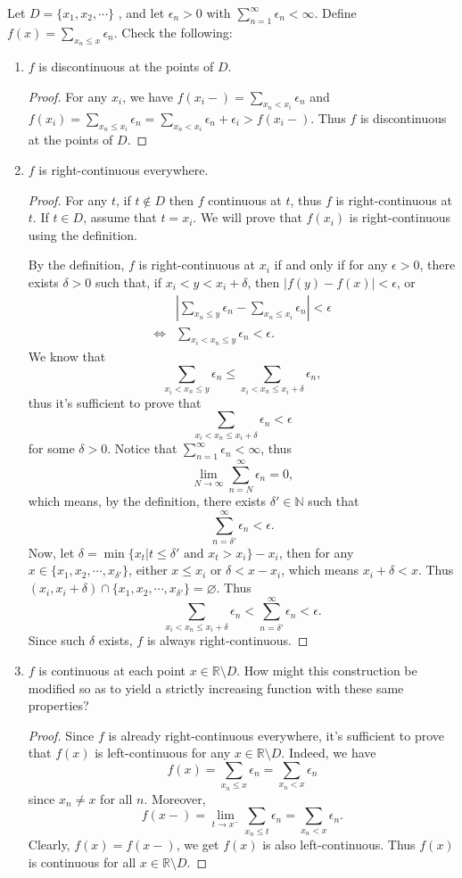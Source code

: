 \documentclass[12pt, a4paper]{article}
\theoremstyle{plain}
\newcommand{\N}{\mathbb{N}}
\newcommand{\R}{\mathbb{R}}
\begin{document}
\begin{exercise}{34}
	Let $D =\{x_1, x_2,\cdots\}$ , and let $\epsilon_n > 0$ with $\sum_{n=1}^\infty{\epsilon_n}<\infty$. Define $f(x) = \sum_{x_n\leq x}{\epsilon_n}$. Check the following: 
	\begin{enumerate}[label=(\roman*)]
	\item  $f$ is discontinuous at the points of $D$.
		\begin{proof}
		For any $x_i$, we have $f(x_i-)=\sum_{x_n<x_i}\epsilon_n$ and $f(x_i)=\sum_{x_n\leq x_i}\epsilon_n=\sum_{x_n<x_i}\epsilon_n+\epsilon_i>f(x_i-)$. Thus $f$ is discontinuous at the points of $D$.
		\end{proof}
	\item $f$ is right-continuous everywhere.
		\begin{proof}
		For any $t$, if $t\notin D$ then $f$ continuous at $t$, thus $f$ is right-continuous at $t$. If $t\in D$, assume that $t=x_i$. We will prove that $f(x_i)$ is right-continuous using the definition.
		
		By the definition, $f$ is right-continuous at $x_i$ if and only if for any $\epsilon >0$, there exists $\delta >0$ such that, if $x_i<y<x_i+\delta$, then $|f(y)-f(x)|<\epsilon$, or
		\begin{align*}
		&|\sum_{x_n\leq y}\epsilon_n-\sum_{x_n\leq x_i}\epsilon_n|<\epsilon\\
		\Leftrightarrow &\sum_{x_i<x_n\leq y}\epsilon_n<\epsilon .		
		\end{align*}
	We know that 
	\[
	\sum_{x_i<x_n\leq y}\epsilon_n\leq \sum_{x_i<x_n\leq x_i+\delta}\epsilon_n ,
	\]
	thus it's sufficient to prove that 
	\[
	\sum_{x_i<x_n\leq x_i+\delta}\epsilon_n <\epsilon
	\]
	for some $\delta >0$. Notice that $\sum_{n=1}^{\infty}{\epsilon_n}<\infty$, thus 
	\[
	\lim_{N\rightarrow\infty}{\sum_{n=N}^{\infty}{\epsilon_n}}=0,
	\]
	which means, by the definition, there exists $\delta'\in\N$ such that 
	\[
	\sum_{n=\delta'}^{\infty}{\epsilon_n}<\epsilon.
	\]
	Now, let $\delta =\min\{x_t|t\leq\delta' \text{ and }x_t>x_i\}-x_i$, then for any $x\in\{x_1,x_2,\cdots,x_{\delta'}\}$, either $x\leq x_i$ or $\delta < x-x_i$, which means $x_i+\delta<x$. Thus $(x_i,x_i+\delta)\cap\{x_1,x_2,\cdots,x_{\delta'}\}=\varnothing$. Thus 
	\[
	\sum_{x_i<x_n\leq x_i+\delta}\epsilon_n < \sum_{n=\delta'}^{\infty}\epsilon_n <\epsilon.
	\]
	Since such $\delta$ exists, $f$ is always right-continuous.
		\end{proof}
	\item $f$ is continuous at each point $x\in \R\setminus D$.
How might this construction be modified so as to yield a strictly increasing function with these same properties?
		\begin{proof}
		Since $f$ is already right-continuous everywhere, it's sufficient to prove that $f(x)$ is left-continuous for any $x\in\R\setminus D$. Indeed, we have 
		\[
		f(x)=\sum_{x_n\leq x}{\epsilon_n}=\sum_{x_n< x}{\epsilon_n}
		\]
		since $x_n\neq x$ for all $n$. Moreover, 
		\[
		f(x-)=\lim_{t\rightarrow x^-}\sum_{x_n\leq t}{\epsilon_n}=\sum_{x_n< x}{\epsilon_n}.
		\]
		Clearly, $f(x)=f(x-)$, we get $f(x)$ is also left-continuous. Thus $f(x)$ is continuous for all $x\in\R\setminus D$.
		

\end{proof}
\end{enumerate}
\end{exercise}
\end{document}

